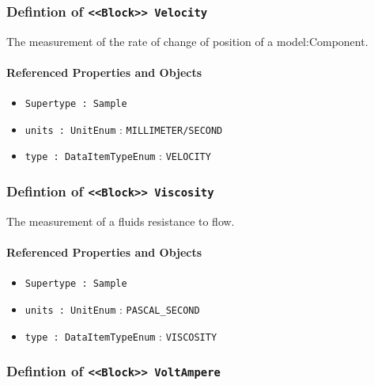 \subsubsection{Defintion of \texttt{<<Block>> Velocity}}
  \label{type:Velocity}

\FloatBarrier

The measurement of the rate of change of position of a {model:Component}.

\FloatBarrier
\paragraph{Referenced Properties and Objects}

\begin{itemize}
\item \texttt{Supertype : Sample}

\item \texttt{units : UnitEnum} : \texttt{MILLIMETER/SECOND}

\item \texttt{type : DataItemTypeEnum} : \texttt{VELOCITY}

\end{itemize}
\FloatBarrier
\subsubsection{Defintion of \texttt{<<Block>> Viscosity}}
  \label{type:Viscosity}

\FloatBarrier

The measurement of a fluids resistance to flow.

\FloatBarrier
\paragraph{Referenced Properties and Objects}

\begin{itemize}
\item \texttt{Supertype : Sample}

\item \texttt{units : UnitEnum} : \texttt{PASCAL_SECOND}

\item \texttt{type : DataItemTypeEnum} : \texttt{VISCOSITY}

\end{itemize}
\FloatBarrier
\subsubsection{Defintion of \texttt{<<Block>> VoltAmpere}}
  \label{type:VoltAmpere}

